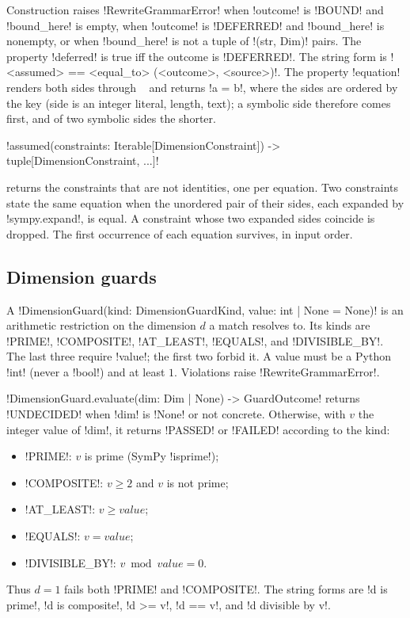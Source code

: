 Construction raises \py!RewriteGrammarError! when \py!outcome! is \code!BOUND! and \py!bound_here!
is empty, when \py!outcome! is \code!DEFERRED! and \py!bound_here! is nonempty, or when
\py!bound_here! is not a tuple of \py!(str, Dim)! pairs. The property \py!deferred! is true iff the
outcome is \code!DEFERRED!. The string form is \code!<assumed> == <equal_to> (<outcome>, <source>)!.
The property \py!equation! renders both sides through ~\cite{meurer2017sympy} and returns \code!a = b!, where the
sides are ordered by the key (side is an integer literal, length, text); a symbolic side therefore
comes first, and of two symbolic sides the shorter.

\begin{signature}
\py!assumed(constraints: Iterable[DimensionConstraint]) -> tuple[DimensionConstraint, ...]!
\end{signature}
returns the constraints that are not identities, one per equation. Two constraints state the same
equation when the unordered pair of their sides, each expanded by \py!sympy.expand!, is equal. A
constraint whose two expanded sides coincide is dropped. The first occurrence of each equation
survives, in input order.

\subsection{Dimension guards}

\begin{definition}\label{def:rewriting-guard}
A 
\py!DimensionGuard(kind: DimensionGuardKind, value: int | None = None)! is an arithmetic restriction on the dimension $d$ a match resolves to. Its kinds are
\code!PRIME!, \code!COMPOSITE!, \code!AT_LEAST!, \code!EQUALS!, and \code!DIVISIBLE_BY!. The last
three require \py!value!; the first two forbid it. A value must be a Python \py!int! (never a
\py!bool!) and at least $1$. Violations raise \py!RewriteGrammarError!.
\end{definition}

\py!DimensionGuard.evaluate(dim: Dim | None) -> GuardOutcome! returns \code!UNDECIDED! when
\py!dim! is \py!None! or not concrete. Otherwise, with $v$ the integer value of \py!dim!, it returns
\code!PASSED! or \code!FAILED! according to the kind:
\begin{itemize}
\item \code!PRIME!: $v$ is prime (SymPy \py!isprime!);
\item \code!COMPOSITE!: $v \ge 2$ and $v$ is not prime;
\item \code!AT_LEAST!: $v \ge \mathit{value}$;
\item \code!EQUALS!: $v = \mathit{value}$;
\item \code!DIVISIBLE_BY!: $v \bmod \mathit{value} = 0$.
\end{itemize}
Thus $d = 1$ fails both \code!PRIME! and \code!COMPOSITE!. The string forms are
\code!d is prime!, \code!d is composite!, \code!d >= v!, \code!d == v!, and \code!d divisible by v!.


